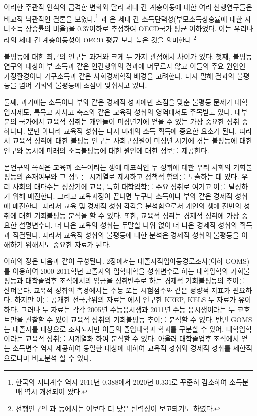 이러한 주관적 인식의 급격한 변화와 달리 세대 간 계층이동에 대한 여러 선행연구들은 비교적 낙관적인 결론을 보였다.\footnote{한국의 지니계수 역시 2011년 0.388에서 2020년 0.331로 꾸준히 감소하여 소득분배 역시 개선되어 왔다.} \citet{cnh11}과 \citet{yang12}은 세대 간 소득탄력성(부모소득상승률에 대한 자녀소득 상승률의 비율)을 0.37이하로 추정하여 OECD국가 평균 이하었다. 이는 우리나라의 세대 간 계층이동성이 OECD 평균 보다 높은 것을 의미한다.\footnote{선행연구인 \citet{kim09}과 \citet{ketl09} 등에서는 이보다 더 낮은 탄력성이 보고되기도 하였다.}

불평등에 대한 최근의 연구는 과거와 크게 두 가지 관점에서 차이가 있다. 첫째,  불평등 연구의 대상이 부$\cdot$소득과 같은 인간행위의 결과에 머무르지 않고 이들의 주요 원인인 가정환경이나 가구소득과 같은 사회경제학적 배경을 고려한다. 다시 말해 결과의 불평등을 넘어 기회의 불평등에 초점이 맞춰지고 있다.
 
둘째, 과거에는 소득이나 부와 같은 경제적 성과에만 초점을 맞춘 불평등 문제가 대학입시제도, 특목고-자사고 축소와 같은 교육적 성취의 영역에서도 주목받고 있다. 대부분의 국가에서 교육적 성취는 개인들이 미성년기에 얻을 수 있는 가장 중요한 성취 중 하나다. 뿐만 아니라 교육적 성취는 다시 미래의 소득 획득에 중요한 요소가 된다. 따라서 교육적 성취에 대한 불평등 연구는 사회구성원이 미성년 시기에 겪는 불평등에 대한 연구와 동시에 미래의 소득불평등에 대한 원인에 대한 정보를 제공한다.

본연구의 목적은 교육과 소득이라는 생애 대표적인 두 성취에 대한 우리 사회의 기회불평등의 존재여부와 그 정도를 시계열로 제시하고 정책적 함의를 도출하는 데 있다. 우리 사회의 대다수는 성장기에 교육, 특히 대학입학를 주요 성취로 여기고 이를 달성하기 위해 매진한다. 그리고 교육과정이 끝나면 누구나 소득이나 부와 같은 경제적 성취에 매진한다. 따라서 교육 및 경제적 성취 각각을 분석함으로서 개인의 생애 전반의 성취에 대한 기회불평등 분석을 할 수 있다. 또한, 교육적 성취는 경제적 성취에 가장 중요한 설명변수다. 더 나은 교육의 성취는 두말할 나위 없이 더 나은 경제적 성취의 획득과 직결된다. 따라서 교육적 성취의 불평등에 대한 분석은 경제적 성취의 불평등을 이해하기 위해서도 중요한 자료가 된다.
 
이하의 장은 다음과 같이 구성된다.
2장에서는 대졸자직업이동경로조사(이하 GOMS)를 이용하여 2000-2011학년 고졸자의 입학대학을 성취변수로 하는 대학입학의 기회불평등과 대학졸업후 초직에서의 임금을 성취변수로 하는 경제적 기회불평등의 추이를 살펴본다. 교육적 성취의 측정에서는 수능 또는 시험점수와 같은 정량적 지표가 필요하다. 하지만 이를 공개한 전국단위의 자료는 \citet{ohetl16}에서 연구한 KEEP, KELS 두 자료가 유이하다. 그러나 두 자료는 각각 2005년 수능응시생과 2011년 수능 응시생이라는 두 코호트만을 관찰할 수 있어 교육적 성취의 기회불평등 추이를 분석할 수 없다. 반면 GOMS는 대졸자를 대상으로 조사되지만 이들의 졸업대학과 학과를 구분할 수 있어, 대학입학이라는 교육적 성취를 시계열화 하여 분석할 수 있다. 아울러 대학졸업후 초직에서 얻는 소득변수 역시 제공하여 동일한 대상에 대하여 교육적 성취와 경제적 성취를 제한적으로나마 비교분석 할 수 있다.

